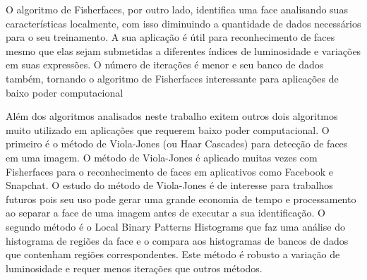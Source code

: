 	O algoritmo de Fisherfaces, por outro lado, identifica uma face analisando suas características localmente, com isso diminuindo a quantidade de dados necessários para o seu treinamento. A sua aplicação é útil para reconhecimento de faces mesmo que elas sejam submetidas a diferentes índices de luminosidade e variações em suas expressões. O número de iterações é menor e seu banco de dados também, tornando o algoritmo de Fisherfaces interessante para aplicações de baixo poder computacional 


	Além dos algoritmos analisados neste trabalho exitem outros dois algoritmos muito utilizado em aplicações que requerem baixo poder computacional. O primeiro é o método de Viola-Jones (ou Haar Cascades) para detecção de faces em uma imagem. O método de Viola-Jones é aplicado muitas vezes com Fisherfaces para o reconhecimento de faces em aplicativos como Facebook e Snapchat. O estudo do método de Viola-Jones é de interesse para trabalhos futuros pois seu uso pode gerar uma grande economia de tempo e processamento ao separar a face de uma imagem antes de executar a sua identificação. O segundo método é o Local Binary Patterns Histograms que faz uma análise do histograma de regiões da face e o compara aos histogramas de bancos de dados que contenham regiões correspondentes. Este método é robusto a variação de luminosidade e requer menos iterações que outros métodos.
	
	


